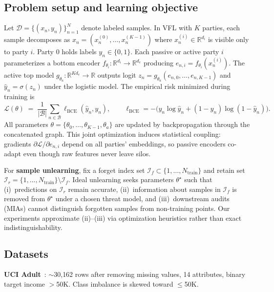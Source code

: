 \documentclass[sigconf,nonacm]{acmart}
\begin{document}
\subsection{Problem setup and learning objective}
Let $\mathcal{D}=\{(x_n,y_n)\}_{n=1}^N$ denote labeled samples. In VFL with $K$ parties, each sample decomposes as $x_n=(x_n^{(0)},\ldots,x_n^{(K-1)})$ where $x_n^{(i)}\in\mathbb{R}^{d_i}$ is visible only to party $i$. Party $0$ holds labels $y_n\in\{0,1\}$. Each passive or active party $i$ parameterizes a bottom encoder $f_{\theta_i}:\mathbb{R}^{d_i}\to\mathbb{R}^{d_e}$ producing $e_{n,i}=f_{\theta_i}(x_n^{(i)})$. The active top model $g_{\theta_a}:\mathbb{R}^{K d_e}\to\mathbb{R}$ outputs logit $z_n = g_{\theta_a}(e_{n,0},\ldots,e_{n,K-1})$ and $\hat{y}_n=\sigma(z_n)$ under the logistic model. The empirical risk minimized during training is
\begin{equation}
  \mathcal{L}(\theta) \;=\; \frac{1}{|\mathcal{B}|}\sum_{n\in\mathcal{B}} \ell_{\mathrm{BCE}}(\hat{y}_n,y_n),
  \qquad
  \ell_{\mathrm{BCE}} = -\bigl( y_n \log \hat{y}_n + (1-y_n)\log(1-\hat{y}_n)\bigr).
\end{equation}
All parameters $\theta=\{\theta_0,\ldots,\theta_{K-1},\theta_a\}$ are updated by backpropagation through the concatenated graph. This joint optimization induces statistical coupling: gradients $\partial \mathcal{L}/\partial e_{n,i}$ depend on all parties' embeddings, so passive encoders co-adapt even though raw features never leave silos.

For \textbf{sample unlearning}, fix a forget index set $\mathcal{I}_f\subset\{1,\ldots,N_{\mathrm{train}}\}$ and retain set $\mathcal{I}_r = \{1,\ldots,N_{\mathrm{train}}\}\setminus \mathcal{I}_f$. Ideal unlearning seeks parameters $\theta^\star$ such that (i)~predictions on $\mathcal{I}_r$ remain accurate, (ii)~information about samples in $\mathcal{I}_f$ is removed from $\theta^\star$ under a chosen threat model, and (iii)~downstream audits (MIAs) cannot distinguish forgotten samples from non-training points. Our experiments approximate (ii)--(iii) via optimization heuristics rather than exact indistinguishability.

\subsection{Datasets}
\textbf{UCI Adult}~\cite{kohavi1996adult}: $\sim$30{,}162 rows after removing missing values, 14 attributes, binary target income $>$50K. Class imbalance is skewed toward $\leq$50K.
\end{document}
